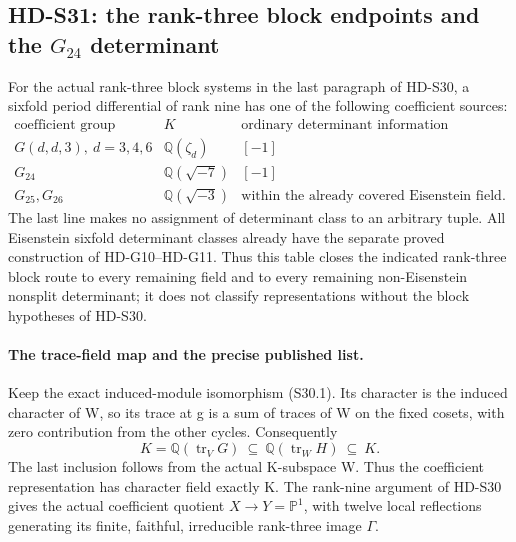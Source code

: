 \subsection{HD-S31: the rank-three block endpoints and the \(G_{24}\) determinant}
\label{sec:rank-three-endpoints}

For the actual rank-three block systems in the last paragraph of
HD-S30, a sixfold period differential of rank nine has one of the
following coefficient sources:
\[
\begin{array}{c|c|c}
\text{coefficient group}&K&\text{ordinary determinant information}\\\hline
G(d,d,3),\ d=3,4,6&\mathbb Q(\zeta_d)&[-1]\\
G_{24}&\mathbb Q(\sqrt{-7})&[-1]\\
G_{25},G_{26}&\mathbb Q(\sqrt{-3})&
 \text{within the already covered Eisenstein field}.
\end{array}
\]
The last line makes no assignment of determinant class to an arbitrary
tuple. All Eisenstein sixfold determinant classes already have the
separate proved construction of HD-G10--HD-G11. Thus this table closes
the indicated rank-three block route to every remaining field and to
every remaining non-Eisenstein nonsplit determinant; it does not
classify representations without the block hypotheses of HD-S30.

\paragraph{The trace-field map and the precise published list.}
Keep the exact induced-module isomorphism (S30.1). Its character is
the induced character of W, so its trace at g is a sum of traces of
W on the fixed cosets, with zero contribution from the other cycles.
Consequently
\[
 K=\mathbb Q(\operatorname{tr}_V G)
 \ \subseteq\ \mathbb Q(\operatorname{tr}_W H)
 \ \subseteq\ K.
\]
The last inclusion follows from the actual K-subspace W. Thus the
coefficient representation has character field exactly K. The
rank-nine argument of HD-S30 gives the actual coefficient quotient
\(X\to Y=\mathbb P^1\), with twelve local reflections generating
its finite, faithful, irreducible rank-three image \(\Gamma\).

